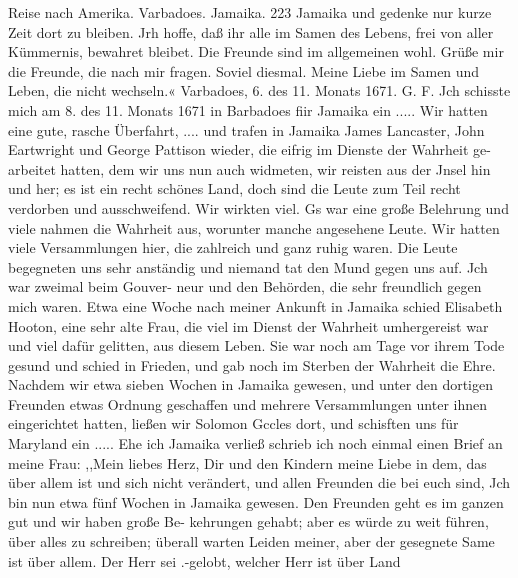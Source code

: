 Reise nach Amerika. Varbadoes. Jamaika. 223
Jamaika und gedenke nur kurze Zeit dort zu bleiben. Jrh hoffe,
daß ihr alle im Samen des Lebens, frei von aller Kümmernis,
bewahret bleibet. Die Freunde sind im allgemeinen wohl. Grüße
mir die Freunde, die nach mir fragen. Soviel diesmal. Meine
Liebe im Samen und Leben, die nicht wechseln.«
Varbadoes, 6. des 11. Monats 1671. G. F.
Jch schisste mich am 8. des 11. Monats 1671 in Barbadoes
fiir Jamaika ein ..... Wir hatten eine gute, rasche Überfahrt, ....
und trafen in Jamaika James Lancaster, John Eartwright und
George Pattison wieder, die eifrig im Dienste der Wahrheit ge-
arbeitet hatten, dem wir uns nun auch widmeten, wir reisten
aus der Jnsel hin und her; es ist ein recht schönes Land, doch
sind die Leute zum Teil recht verdorben und ausschweifend. Wir
wirkten viel. Gs war eine große Belehrung und viele nahmen
die Wahrheit aus, worunter manche angesehene Leute. Wir
hatten viele Versammlungen hier, die zahlreich und ganz ruhig
waren. Die Leute begegneten uns sehr anständig und niemand
tat den Mund gegen uns auf. Jch war zweimal beim Gouver-
neur und den Behörden, die sehr freundlich gegen mich waren.
Etwa eine Woche nach meiner Ankunft in Jamaika schied
Elisabeth Hooton, eine sehr alte Frau, die viel im Dienst der
Wahrheit umhergereist war und viel dafür gelitten, aus diesem
Leben. Sie war noch am Tage vor ihrem Tode gesund und
schied in Frieden, und gab noch im Sterben der Wahrheit die
Ehre. Nachdem wir etwa sieben Wochen in Jamaika gewesen,
und unter den dortigen Freunden etwas Ordnung geschaffen und
mehrere Versammlungen unter ihnen eingerichtet hatten, ließen
wir Solomon Gccles dort, und schisften uns für Maryland
ein .....
Ehe ich Jamaika verließ schrieb ich noch einmal einen Brief
an meine Frau:
,,Mein liebes Herz,
Dir und den Kindern meine Liebe in dem, das über allem
ist und sich nicht verändert, und allen Freunden die bei euch sind,
Jch bin nun etwa fünf Wochen in Jamaika gewesen. Den
Freunden geht es im ganzen gut und wir haben große Be-
kehrungen gehabt; aber es würde zu weit führen, über alles zu
schreiben; überall warten Leiden meiner, aber der gesegnete Same
ist über allem. Der Herr sei .-gelobt, welcher Herr ist über Land


